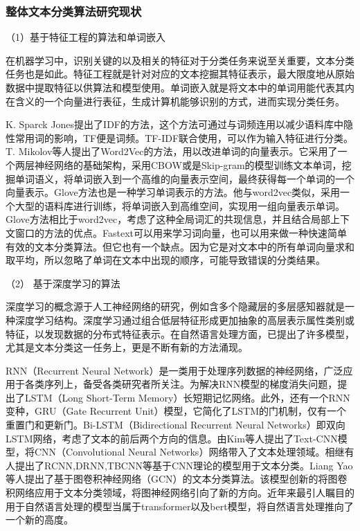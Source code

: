 \subsubsection{整体文本分类算法研究现状}
（1）基于特征工程的算法和单词嵌入

在机器学习中，识别关键的以及相关的特征对于分类任务来说至关重要，文本分类任务也是如此。特征工程就是针对对应的文本挖掘其特征表示，最大限度地从原始数据中提取特征以供算法和模型使用。单词嵌入就是将文本中的单词用能代表其内在含义的一个向量进行表征，生成计算机能够识别的方式，进而实现分类任务。

K. Sparck Jones提出了IDF的方法，这个方法可通过与词频连用以减少语料库中隐性常用词的影响，TF便是词频。TF-IDF联合使用，可以作为输入特征进行分类。T. Mikolov等人提出了Word2Vec的方法，用以改进单词的向量表示。它采用了一个两层神经网络的基础架构，采用CBOW或是Skip-gram的模型训练文本单词，挖掘单词语义，将单词嵌入到一个高维的向量表示空间，最终获得每一个单词的一个向量表示。Glove方法也是一种学习单词表示的方法。他与word2vec类似，采用一个大型的语料库进行训练，将单词嵌入到高维空间，实现用一组向量表示单词。Glove方法相比于word2vec，考虑了这种全局词汇的共现信息，并且结合局部上下文窗口的方法的优点。Fastext可以用来学习词向量，也可以用来做一种快速简单有效的文本分类算法。但它也有一个缺点。因为它是对文本中的所有单词向量求和取平均，所以忽略了单词在文本中出现的顺序，可能导致错误的分类结果。

（2） 基于深度学习的算法

深度学习的概念源于人工神经网络的研究，例如含多个隐藏层的多层感知器就是一种深度学习结构。深度学习通过组合低层特征形成更加抽象的高层表示属性类别或特征，以发现数据的分布式特征表示。在自然语言处理方面，已提出了许多模型，尤其是文本分类这一任务上，更是不断有新的方法涌现。

RNN（Recurrent Neural Network）是一类用于处理序列数据的神经网络，广泛应用于各类序列上，备受各类研究者所关注。为解决RNN模型的梯度消失问题，提出了LSTM（Long Short-Term Memory）长短期记忆网络。此外，还有一个RNN变种，GRU（Gate Recurrent Unit）模型，它简化了LSTM的门机制，仅有一个重置门和更新门。Bi-LSTM（Bidirectional Recurrent Neural Networks）即双向LSTM网络，考虑了文本的前后两个方向的信息。由Kim等人提出了Text-CNN模型，将CNN（Convolutional Neural Networks）网络带入了文本处理领域。相继有人提出了RCNN,DRNN,TBCNN等基于CNN理论的模型用于文本分类。Liang Yao等人提出了基于图卷积神经网络（GCN）的文本分类算法。该模型创新的将图卷积网络应用于文本分类领域，将图神经网络引向了新的方向。近年来最引人瞩目的用于自然语言处理的模型当属于transformer以及bert模型，将自然语言处理推向了一个新的高度。


